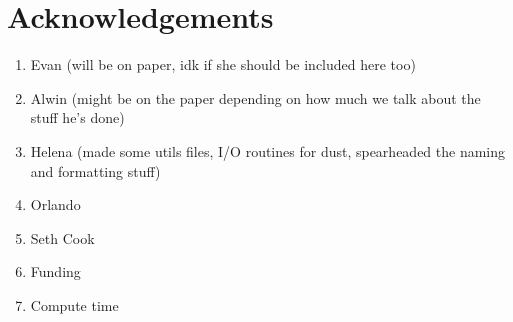 \section{Acknowledgements}

\begin{enumerate}
    \item Evan (will be on paper, idk if she should be included here too)
    \item Alwin (might be on the paper depending on how much we talk about the stuff he's done)
    \item Helena (made some utils files, I/O routines for dust, spearheaded the naming and formatting stuff)
    \item Orlando
    \item Seth Cook
    \item Funding
    \item Compute time
\end{enumerate}